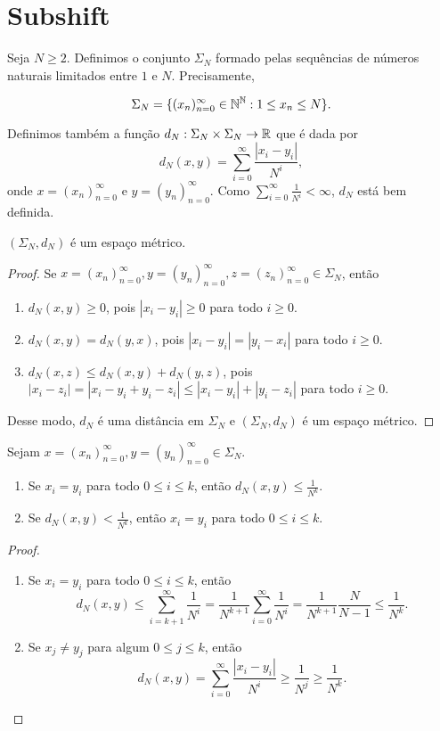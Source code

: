 \section{Subshift}

Seja $N \geq 2$. Definimos o conjunto $\Sigma_N$ formado pelas sequências de números naturais limitados entre $1$ e $N$. Precisamente,

$$\Sigma_N = \{ (x_n)_{n=0}^{\infty} \in \mathbb{N}^{\mathbb{N}} : 1 \leq x_n \leq N \}.$$

Definimos também a função $d_N : \Sigma_N \times \Sigma_N \to \mathbb{R}$ que é dada por
$$d_N(x, y) = \sum_{i=0}^\infty \frac{|x_i - y_i|}{N^i},$$
onde $x = (x_n)_{n=0}^{\infty}$ e $y = (y_n)_{n=0}^{\infty}$. Como $\sum_{i=0}^\infty \frac{1}{N^i} < \infty$, $d_N$ está bem definida.


\begin{proposition}
$(\Sigma_N, d_N)$ é um espaço métrico.
\end{proposition}


\begin{proof}
Se $x = (x_n)_{n=0}^{\infty}, y = (y_n)_{n=0}^{\infty}, z = (z_n)_{n=0}^{\infty} \in \Sigma_N$, então
\begin{enumerate}
\item $d_N(x, y) \geq 0$, pois $|x_i - y_i| \geq 0$ para todo $i \geq 0$.
\item $d_N(x, y) = d_N(y, x)$, pois $|x_i - y_i| = |y_i - x_i|$ para todo $i \geq 0$.
\item $d_N(x, z) \leq d_N(x, y) + d_N(y, z)$, pois $|x_i - z_i| = |x_i - y_i + y_i - z_i| \leq |x_i - y_i| + |y_i - z_i|$ para todo $i \geq 0$.
\end{enumerate}
Desse modo, $d_N$ é uma distância em $\Sigma_N$ e $(\Sigma_N, d_N)$ é um espaço métrico.
\end{proof}


\begin{proposition}
Sejam $x = (x_n)_{n=0}^{\infty}, y = (y_n)_{n=0}^{\infty} \in \Sigma_N$.
\begin{enumerate}
\item Se $x_i = y_i$ para todo $0 \leq i \leq k$, então $d_N(x, y) \leq \frac{1}{N^k}$.
\item Se $d_N(x, y) < \frac{1}{N^k}$, então $x_i = y_i$ para todo $0 \leq i \leq k$.
\end{enumerate}
\end{proposition}


\begin{proof}
\begin{enumerate}
\item Se $x_i = y_i$ para todo $0 \leq i \leq k$, então
$$d_N(x, y) \leq \sum_{i=k+1}^\infty \frac{1}{N^i} = \frac{1}{N^{k+1}}\sum_{i=0}^\infty \frac{1}{N^{i}} = \frac{1}{N^{k+1}} \frac{N}{N - 1} \leq \frac{1}{N^k}.$$

\item Se $x_j \neq y_j$ para algum $0 \leq j \leq k$, então
$$d_N(x, y) = \sum_{i=0}^\infty \frac{|x_i - y_i|}{N^i} \geq \frac{1}{N^j} \geq \frac{1}{N^k}.$$
\end{enumerate}
\end{proof}

